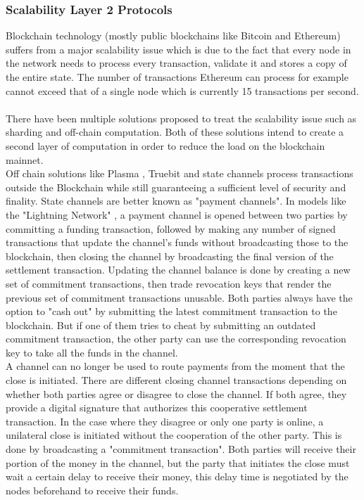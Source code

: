 \subsubsection{Scalability Layer 2 Protocols}
\label{sec:l2protocols}

Blockchain technology (mostly public blockchains like Bitcoin and Ethereum) suffers from a major scalability issue which is due to the fact that every node in the network needs to process every transaction, validate it and stores a copy of the entire state. The number of transactions Ethereum can process for example cannot exceed that of a single node which is currently 15 transactions per second.
\\~\\There have been multiple solutions proposed to treat the scalability issue such as sharding and off-chain computation. Both of these solutions intend to create a second layer of computation in order to reduce the load on the blockchain mainnet.
\\Off chain solutions like Plasma \cite{plasma}, Truebit \cite{truebit} and state channels process transactions outside the Blockchain while still guaranteeing a sufficient level of security and finality. State channels are better known as "payment channels". In models like the "Lightning Network" \cite{lightningnetwork}, a payment channel is opened between two parties by committing a funding transaction, followed by making any number of signed transactions that update the channel's funds without broadcasting those to the blockchain, then closing the channel by broadcasting the final version of the settlement transaction.
Updating the channel balance is done by creating a new set of commitment transactions, then trade revocation keys that render the previous set of commitment transactions unusable. Both parties always have the option to "cash out" by submitting the latest commitment transaction to the blockchain. But if one of them tries to cheat by submitting an outdated commitment transaction, the other party can use the corresponding revocation key to take all the funds in the channel.
\\A channel can no longer be used to route payments from the moment that the close is initiated. There are different closing channel transactions depending on whether both parties agree or disagree to close the channel. If both agree, they provide a digital signature that authorizes this cooperative settlement transaction. In the case where they disagree or only one party is online, a unilateral close is initiated without the cooperation of the other party. This is done by broadcasting a "commitment transaction". Both parties will receive their portion of the money in the channel, but the party that initiates the close must wait a certain delay to receive their money, this delay time is negotiated by the nodes beforehand to receive their funds.
